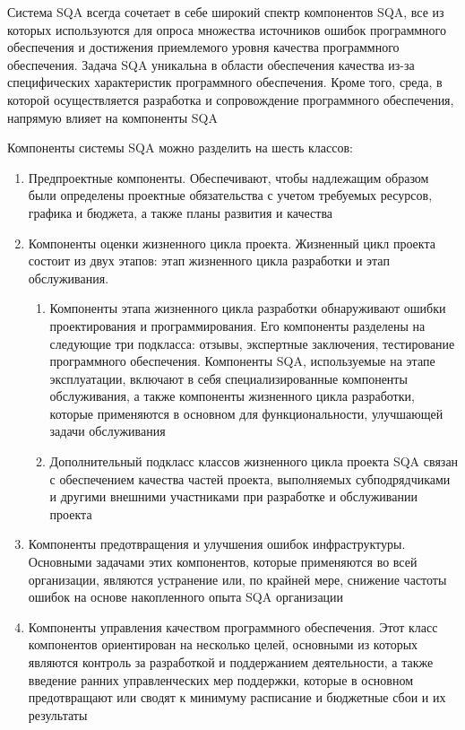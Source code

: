 \documentclass{../industrial-development}
\begin{document}
\lecturenotes

Система SQA всегда сочетает в себе широкий спектр компонентов SQA, все из которых используются для опроса множества источников ошибок программного обеспечения и достижения приемлемого уровня качества программного обеспечения. Задача SQA уникальна в области обеспечения качества из-за специфических характеристик программного обеспечения. Кроме того, среда, в которой осуществляется разработка и сопровождение программного обеспечения, напрямую влияет на компоненты SQA

Компоненты системы SQA можно разделить на шесть классов:
 	 \begin{enumerate}
\item Предпроектные компоненты. Обеспечивают, чтобы надлежащим образом были определены проектные обязательства с учетом требуемых ресурсов, графика и бюджета, а также планы развития и качества
\item Компоненты оценки жизненного цикла проекта. Жизненный цикл проекта состоит из двух этапов: этап жизненного цикла разработки и этап обслуживания.
 		 \begin{enumerate}
	\item Компоненты этапа жизненного цикла разработки обнаруживают ошибки проектирования и программирования. Его компоненты разделены на следующие три подкласса: отзывы, экспертные заключения, тестирование программного обеспечения. Компоненты SQA, используемые на этапе эксплуатации, включают в себя специализированные компоненты обслуживания, а также компоненты жизненного цикла разработки, которые применяются в основном для функциональности, улучшающей задачи обслуживания
	\item Дополнительный подкласс классов жизненного цикла проекта SQA связан с обеспечением качества частей проекта, выполняемых субподрядчиками и другими внешними участниками при разработке и обслуживании проекта
  		\end{enumerate}
\item Компоненты предотвращения и улучшения ошибок инфраструктуры. Основными задачами этих компонентов, которые применяются во всей организации, являются устранение или, по крайней мере, снижение частоты ошибок на основе накопленного опыта SQA организации
\item Компоненты управления качеством программного обеспечения. Этот класс компонентов ориентирован на несколько целей, основными из которых являются контроль за разработкой и поддержанием деятельности, а также введение ранних управленческих мер поддержки, которые в основном предотвращают или сводят к минимуму расписание и бюджетные сбои и их результаты

\end{enumerate}
\end{document}
